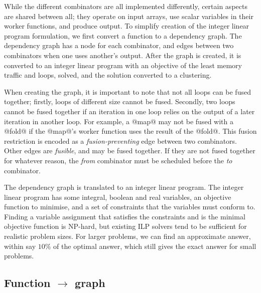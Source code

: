 While the different combinators are all implemented differently, certain aspects are shared between all; they operate on input arrays, use scalar variables in their worker functions, and produce output.
To simplify creation of the integer linear program formulation, we first convert a function to a dependency graph.
The dependency graph has a node for each combinator, and edges between two combinators when one uses another's output.
After the graph is created, it is converted to an integer linear program with an objective of the least memory traffic and loops, solved, and the solution converted to a clustering.

When creating the graph, it is important to note that not all loops can be fused together; firstly, loops of different size cannot be fused. Secondly, two loops cannot be fused together if an iteration in one loop relies on the output of a later iteration in another loop. For example, a @map@ may not be fused with a @fold@ if the @map@'s worker function uses the result of the @fold@.
This fusion restriction is encoded as a \emph{fusion-preventing} edge between two combinators. Other edges are \emph{fusible}, and may be fused together. If they are not fused together for whatever reason, the \emph{from} combinator must be scheduled before the \emph{to} combinator.

The dependency graph is translated to an integer linear program. The integer linear program has some integral, boolean and real variables, an objective function to minimise, and a set of constraints that the variables must conform to. Finding a variable assignment that satisfies the constraints and is the minimal objective function is NP-hard, but existing ILP solvers tend to be sufficient for realistic problem sizes. For larger problems, we can find an approximate answer, within say $10\%$ of the optimal answer, which still gives the exact answer for small problems.


\subsection{Function $\to$ graph}


